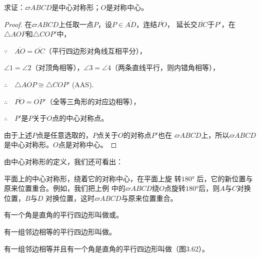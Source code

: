 求证：$\parallelogram ABCD$是中心对称形；$O$是对称中心。

\begin{proof}
    在$\parallelogram ABCD$上任取一点$P$，设$P\in\overline{AD}$，连结$\overline{PO}$，
延长交$\overline{BC}$于$P'$，在$\triangle AOP$和$\triangle COP'$中，

$\because\quad \overline{AO}=\overline{OC}$（平行四边形对角线互相平分），

$\angle 1=\angle 2$（对顶角相等），$\angle 3=\angle 4$（两条直线平行，则内错角相等），

$\therefore\quad \triangle AOP\cong \triangle COP'$ (AAS).

$\therefore\quad \overline{PO}=\overline{OP'}$（全等三角形的对应边相等），

$\therefore\quad P'$是$P$关于$O$点的中心对称点。

由于上述$P$点是任意选取的，$P$点关于$O$的对称点$P'$也在
$\parallelogram ABCD$上，所以$\parallelogram ABCD$是中心对称形。$O$点是对称中心。
\end{proof}

由中心对称形的定义，我们还可看出：

平面上的中心对称形，绕着它的对称中心，在平面上旋
转$\ang{180}$ 后，它的新位置与原来位置重合。例如，我们把上例
中的$\parallelogram ABCD$绕$O$点旋转$\ang{180}$后，则$A$与$C$对换位置，$B$与$D$
对换位置，这时$\parallelogram ABCD$与原来位置重合。

\begin{Definition}
有一个角是直角的平行四边形叫做或。

有一组邻边相等的平行四边形叫做。

有一组邻边相等并且有一个角是直角的平行四边形叫做（图3.62）。
\end{Definition}

\begin{figure}
    \centering
\begin{tikzpicture}
\end{tikzpicture}
    \caption{}
\end{figure}

